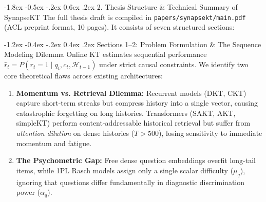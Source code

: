 \documentclass[10.5pt,a4paper]{article}
\makeatletter
\renewcommand{\section}{\@startsection{section}{1}{\z@}%
  {-1.8ex \@plus -0.5ex \@minus -.2ex}%
  {0.6ex \@plus .2ex}%
  {\normalfont\large\bfseries\color{blue!80!black}}}
\renewcommand{\subsection}{\@startsection{subsection}{2}{\z@}%
  {-1.2ex \@plus -0.4ex \@minus -.2ex}%
  {0.4ex \@plus .2ex}%
  {\normalfont\normalsize\bfseries\color{black}}}
\makeatother
\begin{document}
\section{2. Thesis Structure \& Technical Summary of SynapseKT}
The full thesis draft is compiled in \texttt{papers/synapsekt/main.pdf} (ACL preprint format, 10 pages). It consists of seven structured sections:

\subsection{Sections 1--2: Problem Formulation \& The Sequence Modeling Dilemma}
Online KT estimates sequential performance $\hat{r}_t = P(r_t = 1 \mid q_t, c_t, \mathcal{H}_{t-1})$ under strict causal constraints. We identify two core theoretical flaws across existing architectures:
\begin{enumerate}\setlength{\itemsep}{1.5pt}\setlength{\parskip}{0pt}\setlength{\topsep}{0pt}\setlength{\partopsep}{0pt}
    \item \textbf{Momentum vs. Retrieval Dilemma:} Recurrent models (DKT, CKT) capture short-term streaks but compress history into a single vector, causing catastrophic forgetting on long histories. Transformers (SAKT, AKT, simpleKT) perform content-addressable historical retrieval but suffer from \textit{attention dilution} on dense histories ($T > 500$), losing sensitivity to immediate momentum and fatigue.
    \item \textbf{The Psychometric Gap:} Free dense question embeddings overfit long-tail items, while 1PL Rasch models assign only a single scalar difficulty ($\mu_q$), ignoring that questions differ fundamentally in diagnostic discrimination power ($\alpha_q$).
\end{enumerate}
\end{document}
